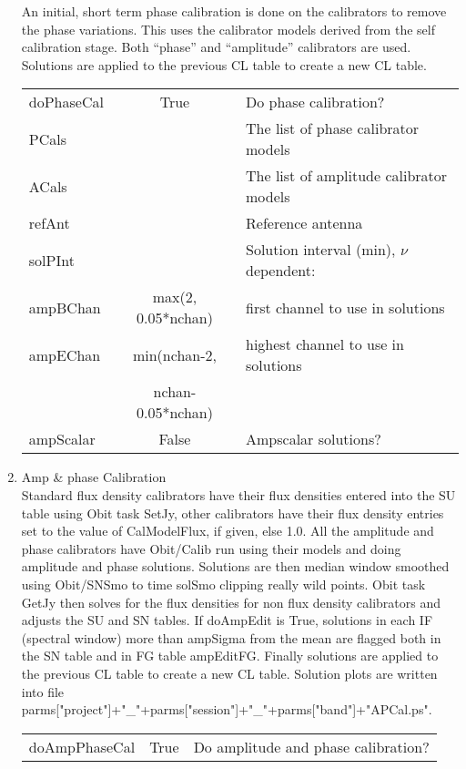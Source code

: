 \documentclass[11pt]{article}
\begin{document}
\begin{enumerate}
An initial, short term phase calibration is done on the calibrators to
remove the phase variations.
This uses the calibrator models derived from the self calibration
stage.
Both ``phase'' and ``amplitude'' calibrators are used.
Solutions are applied to the previous CL table to create a new
CL table.
\begin{center}
\begin{tabular}{|l|c|l|}
\hline
doPhaseCal  & True & Do phase calibration? \\
PCals  &  & The list of phase calibrator models \\
ACals  &  & The list of amplitude calibrator models \\
refAnt  &  & Reference antenna \\
solPInt &  &  Solution interval (min), $\nu$ dependent:\\
ampBChan  & max(2, 0.05*nchan) & first channel to use in solutions \\
ampEChan  &  min(nchan-2, &  highest channel to use in solutions\\
          &  nchan-0.05*nchan) &  \\
ampScalar  & False &  Ampscalar solutions?\\
\hline
\end{tabular}
\end{center}
%
\item Amp \& phase Calibration \\
Standard flux density calibrators have their flux densities entered
into the SU table using Obit task SetJy, other calibrators have their
flux density entries set to the value of CalModelFlux, if given, else 1.0.
All the amplitude and phase calibrators have Obit/Calib run using
their models and doing amplitude and phase solutions.
Solutions are then median window smoothed using Obit/SNSmo to time
solSmo clipping really wild points.
Obit task GetJy then solves for the flux densities for non flux
density calibrators and adjusts the SU and SN tables. If doAmpEdit is
True, solutions in each IF (spectral window) more than ampSigma from
the mean are flagged both in the SN table and in FG table ampEditFG.
Finally solutions are applied to the previous CL table to create a new
CL table.
Solution plots are written into file\\
parms["project"]+"\_"+parms["session"]+"\_"+parms["band"]+"APCal.ps".
\begin{center}
\begin{tabular}{|l|c|l|}
\hline
doAmpPhaseCal  & True & Do amplitude and phase calibration? \\

\end{tabular}
\end{center}
\end{enumerate}
\end{document}
